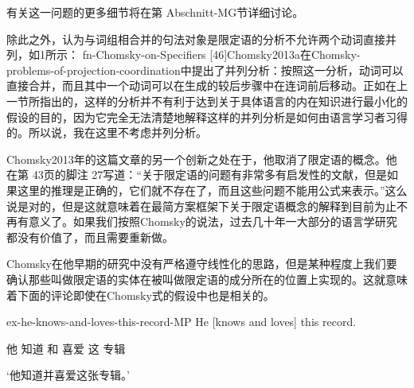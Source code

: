  
 





有关这一问题的更多细节将在第 Abschnitt-MG节详细讨论。


除此之外，认为与词组相合并的句法对象是限定语的分析不允许两个动词直接并列，如1所示： fn-Chomsky-on-Specifiers
[46]Chomsky2013a在Chomsky-problems-of-projection-coordination中提出了并列分析：按照这一分析，动词可以直接合并，而且其中一个动词可以在生成的较后步骤中在连词前后移动。正如在上一节所指出的，这样的分析并不有利于达到关于具体语言的内在知识进行最小化的假设的目的，因为它完全无法清楚地解释这样的并列分析是如何由语言学习者习得的。所以说，我在这里不考虑并列分析。

Chomsky2013年的这篇文章的另一个创新之处在于，他取消了限定语的概念。他在第 43页的脚注 27写道：“关于限定语的问题有非常多有启发性的文献，但是如果这里的推理是正确的，它们就不存在了，而且这些问题不能用公式来表示。”这么说是对的，但是这就意味着在最简方案框架下关于限定语概念的解释到目前为止不再有意义了。如果我们按照Chomsky的说法，过去几十年一大部分的语言学研究都没有价值了，而且需要重新做。

Chomsky在他早期的研究中没有严格遵守线性化的思路，但是某种程度上我们要确认那些叫做限定语的实体在被叫做限定语的成分所在的位置上实现的。这就意味着下面的评论即使在Chomsky式的假设中也是相关的。








 
 




 
 










ex-he-knows-and-loves-this-record-MP
He [knows and loves] this record.

他 知道 和 喜爱 这 专辑

`他知道并喜爱这张专辑。'

